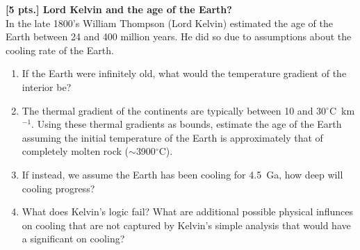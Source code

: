 \item \label{itm:hpmin} {\bf [5 pts.] Lord Kelvin and the age of the Earth?} \\
In the late 1800's William Thompson (Lord Kelvin) estimated the age of the Earth
between 24 and 400 million years.  He did so due to assumptions about the
cooling rate of the Earth.

\begin{enumerate}
    \item If the Earth were infinitely old, what would the temperature gradient
    of the interior be?
    
    \item The thermal gradient of the continents are typically between 10 and
    30$^\circ$C~km$^{-1}$.  Using these thermal gradients as bounds, estimate
    the age of the Earth assuming the initial temperature of the Earth is
    approximately that of completely molten rock ($\sim$3900$^\circ$C).

    \item If instead, we assume the Earth has been cooling for 4.5~Ga, how deep
    will cooling progress?

    \item What does Kelvin's logic fail?  What are additional possible physical
    influnces on cooling that are not captured by Kelvin's simple analysis that
    would have a significant on cooling?
\end{enumerate}
\FloatBarrier

